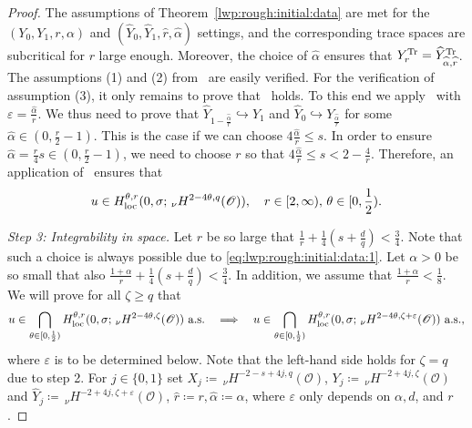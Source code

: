 \documentclass[reqno]{amsart}
\newcommand{\sO}{\mathscr{O}}
\newcommand{\ce}{\coloneqq}
\newcommand{\1}{\mathbf{1}}
\newcommand{\loc}{\textup{loc}}
\newcommand{\nH}{\ensuremath{\,_\nu H}}
\begin{document}
\begin{proof}
                The assumptions of Theorem~\ref{lwp:rough:initial:data} are met  for the $(Y_0,Y_1, r,\alpha)$ and $(\widehat Y_0, \widehat Y_1, \widehat r, \widehat \alpha)$ settings, and the corresponding trace spaces are subcritical for $r$ large enough. Moreover, the choice of $\widehat\alpha$ ensures that $Y_r^{\textup{Tr}}= \widehat Y_{\widehat\alpha,\widehat r}^\textup{Tr}$.  
				The assumptions (1) and (2) from~\cite[Theorem 6.3]{agrestiNonlinearParabolicStochastic2022a} are easily verified. 
				For the verification of assumption (3), it only remains to prove that~\cite[(6.1)]{agrestiNonlinearParabolicStochastic2022a} holds. To this end we apply~\cite[Lemma 6.2 (4)]{agrestiNonlinearParabolicStochastic2022a} with $\varepsilon=\frac{\widehat\alpha}{r}$. We thus need to prove that $\widehat Y_{1-\frac{\widehat \alpha}{r}}\hookrightarrow Y_1$ and $\widehat Y_0 \hookrightarrow Y_{\frac{\widehat\alpha}{r}}$ for some $\widehat\alpha\in (0,\frac{r}{2}-1)$. This is the case if we can choose $4\frac{\widehat \alpha}{r}\le s$. In order to ensure $\widehat\alpha =  \frac{r}{4}s \in (0,\frac{r}{2}-1)$, we need to choose $r$  so that 
				$4\frac{\widehat\alpha}{r}\le s < 2-\frac{4}{r}$. Therefore, an application of~\cite[Theorem 6.3]{agrestiNonlinearParabolicStochastic2022a} ensures that 
				$$ u\in H^{\theta,r}_{\loc}(0,\sigma; \nH^{2-4\theta,q}(\sO)), \quad r\in [2,\infty),\, \theta\in [0,\frac{1}{2}).$$
				
				\emph{Step 3: Integrability in space.} Let $r$ be so large that $\frac{1}{r}+\frac{1}{4}(s+\frac{d}{q})<\frac{3}{4}$. Note that such a choice is always possible due to \eqref{eq:lwp:rough:initial:data:1}. Let $\alpha>0$ be so small that also $\frac{1+\alpha }{r}+\frac{1}{4}(s+\frac{d}{q})< \frac{3}{4}$. In addition, we assume that $\frac{1+\alpha}{r}<\frac{1}{8}$.  We will prove for all $\zeta \ge q$ that 
				\begin{equation}
					u\in \bigcap_{\theta\in [0,\frac{1}{2})}H_{\loc}^{\theta,r}(0,\sigma; \nH^{2-4\theta,\zeta}(\sO))\text{ a.s.} \quad \Longrightarrow \quad u\in \bigcap_{\theta\in [0,\frac{1}{2})} H_{\loc}^{\theta,r}(0,\sigma; \nH^{2-4\theta,\zeta+\varepsilon}(\sO)) \text{ a.s.,}
				\end{equation}
				where $\varepsilon$ is to be determined below. 
				Note that the left-hand side holds for $\zeta=q$ due to step 2. 
				For $j\in \{0,1\}$ set $X_j\ce \nH^{-2-s+4j,q}(\sO)$, $Y_j\ce \nH^{-2+4j,\zeta}(\sO)$ and $\widehat Y_j \ce \nH^{-2+4j,\zeta+\varepsilon}(\sO)$, $\widehat r\ce r, \widehat \alpha \ce \alpha$, where $\varepsilon $ only depends on $\alpha, d$, and $r$. 
				

\end{proof}
\end{document}

